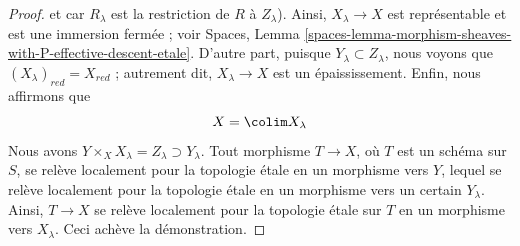 \begin{proof}
et car $R_\lambda$ est la restriction de $R$ à $Z_\lambda$).
Ainsi, $X_\lambda \to X$ est représentable et est une immersion fermée ; voir
Spaces, Lemma
\ref{spaces-lemma-morphism-sheaves-with-P-effective-descent-etale}.
D'autre part, puisque $Y_\lambda \subset Z_\lambda$, nous voyons que
$(X_\lambda)_{red} = X_{red}$ ; autrement dit, $X_\lambda \to X$
est un épaississement. Enfin, nous affirmons que
$$
X = \colim X_\lambda
$$
Nous avons $Y \times_X X_\lambda = Z_\lambda \supset Y_\lambda$. Tout
morphisme $T \to X$, où $T$ est un schéma sur $S$, se relève localement pour la topologie étale
en un morphisme vers $Y$, lequel se relève localement pour la topologie étale en un morphisme
vers un certain $Y_\lambda$. Ainsi, $T \to X$ se relève localement pour la topologie étale sur
$T$ en un morphisme vers $X_\lambda$. Ceci achève la démonstration.
\end{proof}


